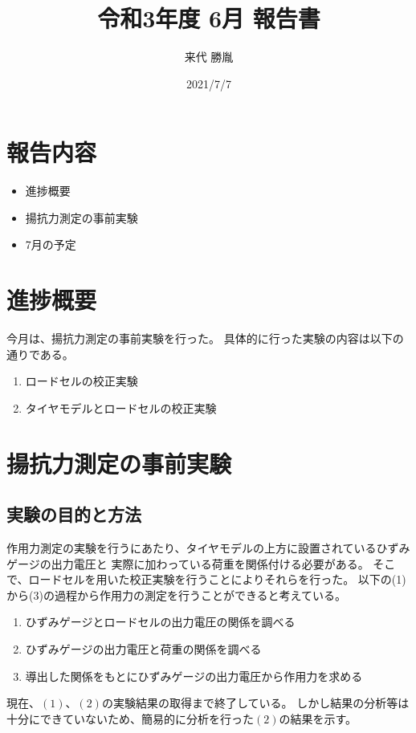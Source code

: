 \documentclass[twocolumn,a4j]{jsarticle}
\author{来代 勝胤}
\title{令和3年度 6月 報告書}
\date{2021/7/7}
\begin{document}
\maketitle
\section*{報告内容}
\begin{itemize}
    \item 進捗概要
    \item 揚抗力測定の事前実験
    \item 7月の予定
\end{itemize}
\section{進捗概要}
今月は、揚抗力測定の事前実験を行った。
具体的に行った実験の内容は以下の通りである。
\begin{enumerate}[(1)]
    \item ロードセルの校正実験
    \item タイヤモデルとロードセルの校正実験
\end{enumerate}
\section{揚抗力測定の事前実験}
\subsection{実験の目的と方法}
作用力測定の実験を行うにあたり、タイヤモデルの上方に設置されているひずみゲージの出力電圧と
実際に加わっている荷重を関係付ける必要がある。
そこで、ロードセルを用いた校正実験を行うことによりそれらを行った。
以下の(1)から(3)の過程から作用力の測定を行うことができると考えている。
\begin{enumerate}[(1)]
    \item ひずみゲージとロードセルの出力電圧の関係を調べる
    \item ひずみゲージの出力電圧と荷重の関係を調べる
    \item 導出した関係をもとにひずみゲージの出力電圧から作用力を求める
\end{enumerate}
現在、$\left(1\right)$、$\left(2\right)$の実験結果の取得まで終了している。
しかし結果の分析等は十分にできていないため、簡易的に分析を行った$\left(2\right)$の結果を示す。\\
\end{document}
